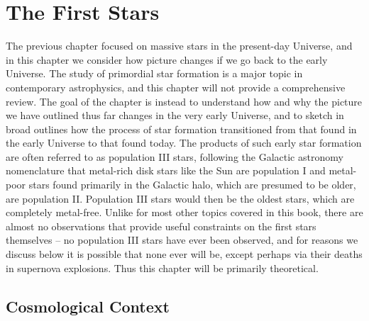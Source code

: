 \chapter{The First Stars}
\label{ch:first_stars}


The previous chapter focused on massive stars in the present-day Universe, and in this chapter we consider how picture changes if we go back to the early Universe. The study of primordial star formation is a major topic in contemporary astrophysics, and this chapter will not provide a comprehensive review. The goal of the chapter is instead to understand how and why the picture we have outlined thus far changes in the very early Universe, and to sketch in broad outlines how the process of star formation transitioned from that found in the early Universe to that found today. The products of such early star formation are often referred to as population III stars, following the Galactic astronomy nomenclature that metal-rich disk stars like the Sun are population I and metal-poor stars found primarily in the Galactic halo, which are presumed to be older, are population II. Population III stars would then be the oldest stars, which are completely metal-free. Unlike for most other topics covered in this book, there are almost no observations that provide useful constraints on the first stars themselves -- no population III stars have ever been observed, and for reasons we discuss below it is possible that none ever will be, except perhaps via their deaths in supernova explosions. Thus this chapter will be primarily theoretical.

\section{Cosmological Context}

